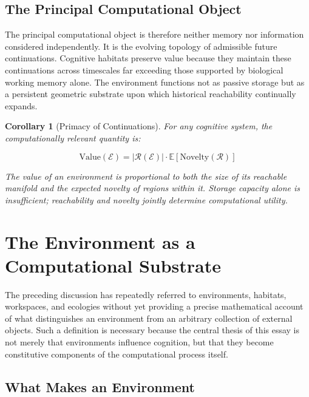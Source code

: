 \documentclass[12pt,oneside]{article}
\newtheorem{corollary}[definition]{Corollary}
\theoremstyle{remark}
\begin{document}
\subsection{The Principal Computational Object}

The principal computational object is therefore neither memory nor information considered independently. It is the evolving topology of admissible future continuations. Cognitive habitats preserve value because they maintain these continuations across timescales far exceeding those supported by biological working memory alone. The environment functions not as passive storage but as a persistent geometric substrate upon which historical reachability continually expands.

\begin{corollary}[Primacy of Continuations]
For any cognitive system, the computationally relevant quantity is:

\[
\text{Value}(\mathcal{E}) = |\mathcal{R}(\mathcal{E})| \cdot \mathbb{E}[\text{Novelty}(\mathcal{R})]
\]

The value of an environment is proportional to both the size of its reachable manifold and the expected novelty of regions within it. Storage capacity alone is insufficient; reachability and novelty jointly determine computational utility.
\end{corollary}



\section{The Environment as a Computational Substrate}

The preceding discussion has repeatedly referred to environments, habitats, workspaces, and ecologies without yet providing a precise mathematical account of what distinguishes an environment from an arbitrary collection of external objects. Such a definition is necessary because the central thesis of this essay is not merely that environments influence cognition, but that they become constitutive components of the computational process itself.

\subsection{What Makes an Environment}
\end{document}
